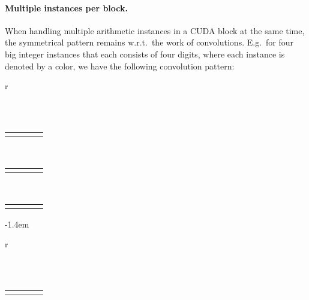 \paragraph{Multiple instances per block.}
When handling multiple arithmetic instances in a CUDA block at the same time,
the symmetrical pattern remains w.r.t.\ the work of convolutions. E.g.\ for four
big integer instances that each consists of four digits, where each instance is
denoted by a color, we have the following convolution pattern:
\begin{center}
  \begin{tabular}{r}
    \begin{tabular}{|C{0.1cm}|C{0.1cm}|C{0.1cm}|C{0.1cm}|}
      \hline
       \cgray & \cgray &\cgray  &\cgray \\
      \hline
    \end{tabular}\\[0.1ex]
    \begin{tabular}{C{0.1cm}|C{0.1cm}|C{0.1cm}|C{0.1cm}|}
       & \cgray & \cgray & \cgray\\
    \end{tabular}\\[0.1ex]
    \begin{tabular}{C{0.1cm}C{0.1cm}|C{0.1cm}|C{0.1cm}|}
       &  & \cgray & \cgray\\
    \end{tabular}\\[0.1ex]
    \begin{tabular}{C{0.1cm}C{0.1cm}C{0.1cm}|C{0.1cm}|}
       &  &  & \cgray \\
    \end{tabular}
  \end{tabular}
  \kern-1.4em
  \begin{tabular}{r}
    \begin{tabular}{C{0.1cm}|C{0.1cm}|C{0.1cm}|C{0.1cm}|}
      \hline
      \cbeige &\cbeige  &\cbeige  &\cbeige \\
      \hline
    \end{tabular}\\[0.1ex]
    \begin{tabular}{C{0.1cm}|C{0.1cm}|C{0.1cm}|C{0.1cm}|}
       & \cbeige & \cbeige & \cbeige\\
    \end{tabular}\\[0.1ex]
    \begin{tabular}{C{0.1cm}C{0.1cm}|C{0.1cm}|C{0.1cm}|}

\end{tabular}
\end{tabular}
\end{center}
